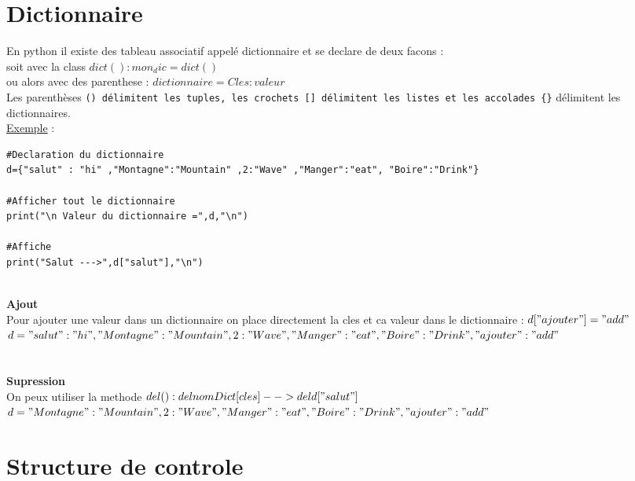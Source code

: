 \documentclass[a4paper,12pt,openany]{book}
\begin{document}
\chapter{Dictionnaire}
En python il existe des tableau associatif appelé dictionnaire et se declare de deux facons :\\
soit avec la class $dict() : mon_dic=dict()$\\
ou alors avec des parenthese : $dictionnaire = {Cles : valeur}$ \\
Les parenthèses \verb+() délimitent les tuples, les crochets [] délimitent les listes et les accolades {}+ délimitent les dictionnaires.
\\
\underline{Exemple} : \\
\begin{verbatim}
#Declaration du dictionnaire
d={"salut" : "hi" ,"Montagne":"Mountain" ,2:"Wave" ,"Manger":"eat", "Boire":"Drink"}

#Afficher tout le dictionnaire
print("\n Valeur du dictionnaire =",d,"\n")

#Affiche 
print("Salut --->",d["salut"],"\n")
\end{verbatim}
\\
\textbf{Ajout}\\
Pour ajouter une valeur dans un dictionnaire on place directement la cles et ca valeur dans le dictionnaire : $d["ajouter"]= "add" $ \\
$d={"salut" : "hi" ,"Montagne":"Mountain" ,2:"Wave" ,"Manger":"eat", "Boire":"Drink","ajouter":"add"}$ \\
\\
\\
\textbf{Supression}\\
On peux utiliser la methode $del() : del nomDict[cles] --> del d["salut"] $ \\
$ d={"Montagne":"Mountain" ,2:"Wave" ,"Manger":"eat", "Boire":"Drink","ajouter":"add"} $ \\




\chapter{Structure de controle}
\end{document}
